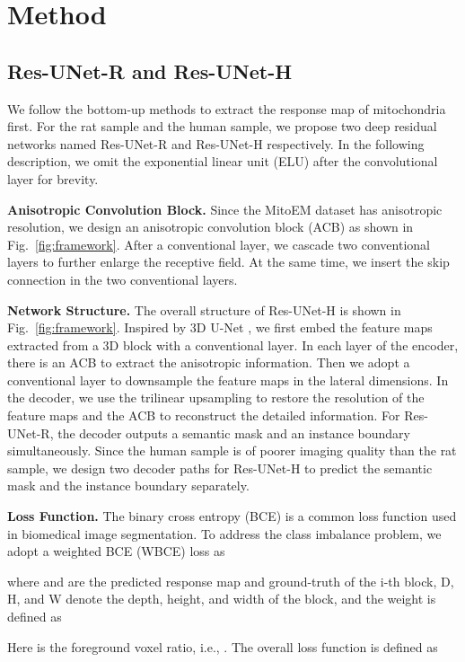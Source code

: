 \documentclass{article}
\begin{document}
\section{Method}
\label{sec:method}
\subsection{Res-UNet-R and Res-UNet-H}
We follow the bottom-up methods to extract the response map of mitochondria first. For the rat sample and the human sample, we propose two deep residual networks named Res-UNet-R and Res-UNet-H respectively. In the following description, we omit the exponential linear unit (ELU) after the convolutional layer for brevity.

\textbf{Anisotropic Convolution Block.} 
Since the MitoEM dataset has anisotropic resolution, we design an anisotropic convolution block (ACB) as shown in Fig.~\ref{fig:framework}. After a  conventional layer, we cascade two   conventional layers to further enlarge the receptive field. At the same time, we insert the skip connection in the two   conventional layers. 

\textbf{Network Structure.}
The overall structure of Res-UNet-H is shown in Fig.~\ref{fig:framework}. Inspired by 3D U-Net \cite{cciccek20163d}, we first embed the feature maps extracted from a 3D block with a  conventional layer. In each layer of the encoder, there is an ACB to extract the anisotropic information. Then we adopt a  conventional layer to downsample the feature maps in the lateral dimensions. In the decoder, we use the trilinear upsampling to restore the resolution of the feature maps and the ACB to reconstruct the detailed information. For Res-UNet-R, the decoder outputs a semantic mask and an instance boundary simultaneously. Since the human sample is of poorer imaging quality than the rat sample, we design two decoder paths for Res-UNet-H to predict the semantic mask and the instance boundary separately.



\textbf{Loss Function.} 
The binary cross entropy (BCE) is a common loss function used in biomedical image segmentation. To address the class imbalance problem, we adopt a weighted BCE (WBCE) loss as

where  and  are the predicted response map and ground-truth of the i-th block, D, H, and W denote the depth, height, and width of the block, and the weight  is defined as

Here  is the foreground voxel ratio, i.e., . 
The overall loss function  is defined as 
\end{document}
